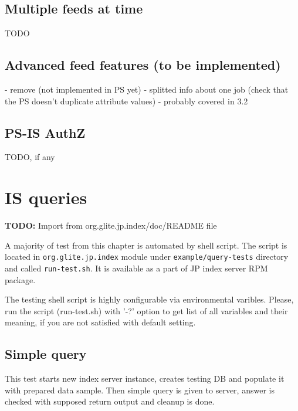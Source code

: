 \documentclass{egee}
\def\todo#1{\textbf{TODO:} #1}
\begin{document}
\begin{enumerate}
\subsection{Multiple feeds at time}
TODO

\subsection{Advanced feed features (to be implemented)}
- remove (not implemented in PS yet)
- splitted info about one job (check that the PS doesn't duplicate
  attribute values) - probably covered in 3.2


\subsection{PS-IS AuthZ}
TODO, if any

\section{IS queries}
\todo{Import from org.glite.jp.index/doc/README file}


%
%
%

A majority of test from this chapter is automated by shell
script. The script is located in \texttt{org.glite.jp.index} module
under \texttt{example/query-tests} directory and called \texttt{run-test.sh}.
It is available as a part of JP index server RPM package.

\begin{hints}
The testing shell script is highly configurable via
environmental varibles.  Please, run the script (run-test.sh) with
'-?' option to get list of all variables and their meaning, if you are
not satisfied with default setting.
\end{hints}

\subsection{Simple query}
This test starts new index server instance, creates testing DB
and populate it with prepared data sample. Then simple query is given
to server, answer is checked with supposed return output and
cleanup is done.



\end{enumerate}
\end{document}
